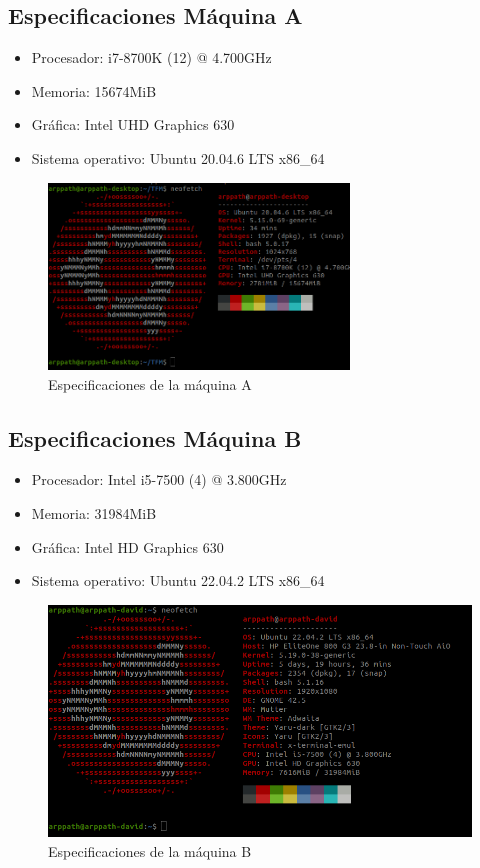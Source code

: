 \subsection{Especificaciones Máquina A}
\label{maquina_A}
\begin{itemize}
    \item Procesador: i7-8700K (12) @ 4.700GHz
    \item Memoria: 15674MiB
    \item Gráfica: Intel UHD Graphics 630
    \item Sistema operativo: Ubuntu 20.04.6 LTS x86\_64
\end{itemize}
\begin{figure}[ht!]
    \centering
    \includegraphics[width=8cm]{archivos/img/anexos/maquinaA.png}
    \caption{Especificaciones de la máquina A}
    \label{fig:maquinaA}
\end{figure}


\subsection{Especificaciones Máquina B}
\label{maquina_B}
\begin{itemize}
    \item Procesador: Intel i5-7500 (4) @ 3.800GHz
    \item Memoria: 31984MiB
    \item Gráfica: Intel HD Graphics 630
    \item Sistema operativo: Ubuntu 22.04.2 LTS x86\_64
\end{itemize}
\begin{figure}[ht!]
    \centering
    \includegraphics[width=\textwidth]{archivos/img/anexos/maquinaB.png}
    \caption{Especificaciones de la máquina B}
    \label{fig:maquinaB}
\end{figure}

